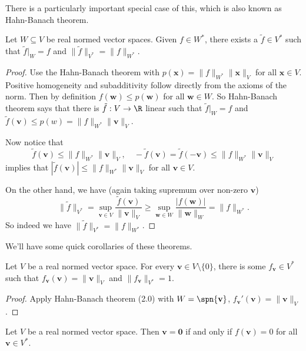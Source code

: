 \documentclass[a4paper]{article}
\begin{document}
There is a particularly important special case of this, which is also known as Hahn-Banach theorem.
\begin{cor}
  Let $W \subseteq V$ be real normed vector spaces. Given $f \in W^*$, there exists a $\tilde{f} \in V^*$ such that $\tilde{f}|_W = f$ and $\|\tilde{f}\|_{V^*} = \|f\|_{W^*}$.
\end{cor}

\begin{proof}
  Use the Hahn-Banach theorem with $p(\mathbf{x}) = \|f\|_{W^*}\|\mathbf{x}\|_V$ for all $\mathbf{x}\in V$. Positive homogeneity and subadditivity follow directly from the axioms of the norm. Then by definition $f(\mathbf{w}) \leq p(\mathbf{w})$ for all $\mathbf{w}\in W$. So Hahn-Banach theorem says that there is $\tilde{f}: V\to \R$ linear such that $\tilde{f}|_W = f$ and $\tilde{f}(\mathbf{v}) \leq p(w) = \|f\|_{W^*} \|\mathbf{v}\|_V$.

  Now notice that
  \[
    \tilde{f}(\mathbf{v}) \leq \|f\|_{W^*}\|\mathbf{v}\|_V,\quad -\tilde{f}(\mathbf{v}) = \tilde{f}(-\mathbf{v}) \leq \|f\|_{W^*}\|\mathbf{v}\|_V
  \]
  implies that $|\tilde{f}(\mathbf{v})| \leq \|f\|_{W^*}\|\mathbf{v}\|_V$ for all $\mathbf{v}\in V$.

  On the other hand, we have (again taking supremum over non-zero $\mathbf{v}$)
  \[
    \|\tilde{f}\|_{V^*} = \sup_{\mathbf{v}\in V} \frac{\tilde{f}(\mathbf{v})}{\|\mathbf{v}\|_V} \geq \sup_{\mathbf{w}\in W} \frac{|f(\mathbf{w})|}{\|\mathbf{w}\|_W} = \|f\|_{W^*}.
  \]
  So indeed we have $\|\tilde{f}\|_{V^*} = \|f\|_{W^*}$.
\end{proof}

We'll have some quick corollaries of these theorems.
\begin{prop}
  Let $V$ be a real normed vector space. For every $\mathbf{v}\in V\setminus \{0\}$, there is some $f_{\mathbf{v}} \in V^*$ such that $f_{\mathbf{v}}(\mathbf{v}) = \|\mathbf{v}\|_V$ and $\|f_{\mathbf{v}}\|_{V^*} = 1$.
\end{prop}

\begin{proof}
  Apply Hahn-Banach theorem (2.0) with $W = \spn\{\mathbf{v}\}$, $f_{\mathbf{v}}'(\mathbf{v}) = \|\mathbf{v}\|_V$.
\end{proof}

\begin{cor}
  Let $V$ be a real normed vector space. Then $\mathbf{v} = \mathbf{0}$ if and only if $f(\mathbf{v}) = 0$ for all $\mathbf{v}\in V^*$.
\end{cor}
\end{document}
